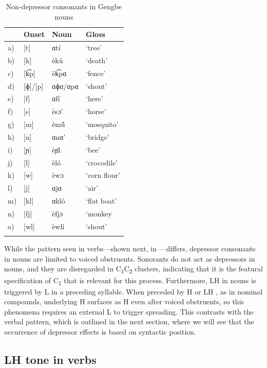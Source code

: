 \documentclass[output=paper
,newtxmath
,modfonts
,nonflat]{langsci/langscibook}
\begin{document}
\begin{table}
\begin{tabularx}{.66\textwidth}{Xlll}
\lsptoprule
&  Onset &  Noun &  Gloss\\
\midrule
{a)} & [t] & ɑtí &  {‘tree’}\\
{b)} & [k] & èkú &  {‘death’}\\
{c)} & [k͡p] & èk͡pɑ &  {‘fence’} \\
{d)} & [ɸ]/[p] & ɑɸɑ/ɑpɑ &  {‘shout’}\\
{e)} & [f] & ɑfí &  {‘here’}\\
{f)} & [s] & èsɔ\'{}  &  {‘horse’}\\
{g)} & [m] & èmṹ &  {‘mosquito’}\\
{h)} & [n] & ɑnɑ\'{}  &  {‘bridge’}\\
 {i)} & [ɲ] & èɲ\'{\~\i} &  {‘bee’}\\
 {j)} & [l] & èló &  {‘crocodile’}\\
 {k)} & [w] & èwɔ &  {‘corn flour’}\\
 {l)} & [j] & ɑjɑ &  {‘air’}\\
 {m)} & [kl] & ɑkló &  {‘flat boat’}\\
 {n)} & [fj] & èfjɔ &  {‘monkey}\\
 {o)} & [wl] & èwlí &  {‘shout’}\\
\lspbottomrule
\end{tabularx}
\caption{Non-depressor consonants in Gengbe nouns}
\label{tab:lotven:4}
\end{table}

While the pattern seen in verbs—shown next, in —differs, depressor consonants in nouns are limited to voiced obstruents. Sonorants do not act as depressors in nouns, and they are disregarded in C\textsubscript{1}C\textsubscript{2} clusters, indicating that it is the featural specification of C\textsubscript{1} that is relevant for this process. Furthermore, LH  in nouns is triggered by L  in a preceding syllable. When preceded by H or LH , as in nominal compounds, underlying H surfaces as H even after voiced obstruents, so this phenomena requires an external L  to trigger spreading. This contrasts with the verbal pattern, which is outlined in the next section, where we will see that the occurrence of depressor effects is based on syntactic position.

\subsection{LH tone in verbs}\label{sec:lotven:4.2}
\end{document}
